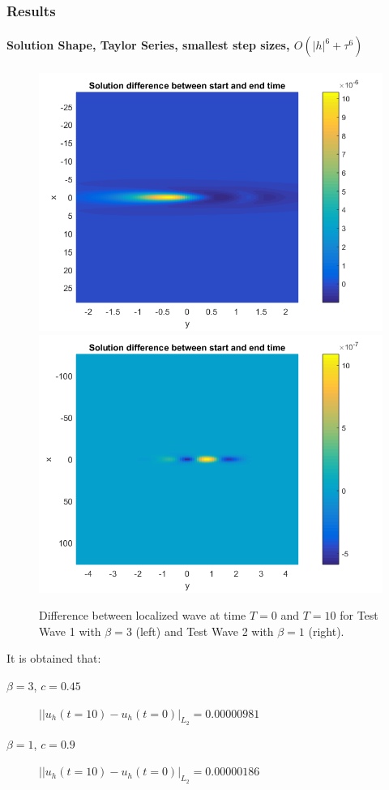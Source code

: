 \documentclass{beamer}
\begin{document}

\begin{frame}
\frametitle{Results}
\framesubtitle{Solution Shape, Taylor Series, smallest step sizes, $O(|h|^6+\tau^6)$}
\begin{figure}[ht]
	\centering
	\begin{minipage}[b]{0.49\linewidth}
		\includegraphics[width=\linewidth]{../amitans/figures/compare_start_end_bt3_c045_T10.png}
	\end{minipage}	
	\begin{minipage}[b]{0.49\linewidth}
		 \includegraphics[width=\linewidth]{../amitans/figures/compare_start_end_bt1_c090_T10.png}
	\end{minipage}

Difference between localized wave at time $T=0$ and $T=10$ for Test Wave 1 with $\beta =3$  (left) and Test Wave 2 with $\beta=1$ (right). 
\end{figure}

It is obtained that:
\begin{description}
 \item[$\beta = 3$, $c = 0.45$] $||u_h(t=10)-u_h(t=0)|_{L_2} =  0.00000981$
 \item[$\beta = 1$, $c = 0.9$] $||u_h(t=10)-u_h(t=0)|_{L_2} = 0.00000186$
\end{description}
\end{frame}
\end{document}
